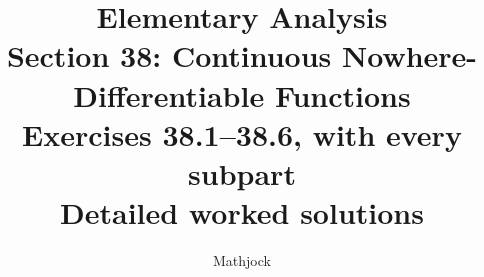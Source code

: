 
\title{\textbf{Elementary Analysis}\\[0.3em]
Section 38: Continuous Nowhere-Differentiable Functions\\[0.4em]
\large Exercises 38.1--38.6, with every subpart\\
Detailed worked solutions}
\author{Mathjock}
\date{}

\maketitle
\bookinfo
\tableofcontents
\clearpage
\setcounter{section}{37}


